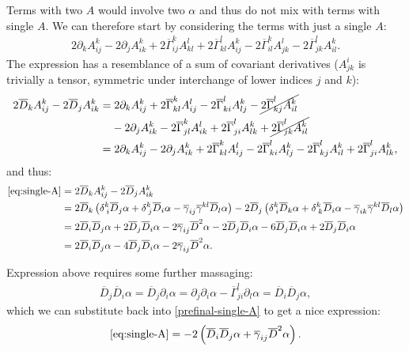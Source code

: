 \documentclass[aps,prd,preprint]{revtex4-1}
\newcommand{\ogamma}{\overline{\gamma}}
\newcommand{\OGamma}{\overline{\Gamma}}
\newcommand{\OD}{\overline{D}}
\begin{document}
Terms with two $A$ would involve two $\alpha$ and thus do not mix with terms with single $A$. We can therefore 
start by considering the terms with just a single $A$:
\begin{align}\label{eq:single-A}
2 \partial_k A^k_{ij} -2 \partial_j A^k_{ik} +
  2 \OGamma^k_{ij} A^l_{kl}  + 2 \OGamma^l_{kl} A^k_{ij} -
  2 \OGamma^k_{il} A^l_{jk} - 2 \OGamma^l_{jk} A^k_{il}.
\end{align}
The expression has a resemblance of a sum of covariant derivatives ($A^i_{jk}$ is trivially a tensor, symmetric under
interchange of lower indices $j$ and $k$):
\begin{align}\label{eq:cov-diff}
2 \OD_k A^k_{ij} - 2 \OD_j A^k_{ik} = & \;
  2 \partial_k A^k_{ij} + 2 \OGamma^k_{kl} A^l_{ij} - 2 \OGamma^l_{ki} A^k_{lj} -
    \cancel{2 \OGamma^l_{kj} A^k_{il}} \notag \\
  & - 2 \partial_j A^k_{ik} - 2 \OGamma^k_{jl} A^l_{ik} + 2 \OGamma^l_{ji} A^k_{lk} + \cancel{2 \OGamma^l_{jk} A^k_{il}} \\
= & \; 2 \partial_k A^k_{ij} - 2 \partial_j A^k_{ik} + 2 \OGamma^k_{kl} A^l_{ij} - 2 \OGamma^l_{ki} A^k_{lj} -
  2 \OGamma^l_{kj} A^k_{il} + 2 \OGamma^l_{ji} A^k_{lk},
\end{align}
and thus:
\begin{align}
\eqref{eq:single-A} = & \; 2 \OD_k A^k_{ij} - 2 \OD_j A^k_{ik} \\
= & \; 2 \OD_k \left(
    \delta^k_{\; i} \OD_j \alpha + \delta^k_{\; j} \OD_i \alpha - \ogamma_{ij} \ogamma^{kl} \OD_l \alpha
  \right) -
  2 \OD_j \left(
    \delta^k_{\; i} \OD_k \alpha + \delta^k_{\; k} \OD_i \alpha - \ogamma_{ik} \ogamma^{kl} \OD_l \alpha
  \right) \\
= & \; 2 \OD_i \OD_j \alpha + 2 \OD_j \OD_i \alpha - 2 \ogamma_{ij} \OD^2 \alpha - 2 \OD_j \OD_i \alpha -
  6 \OD_j \OD_i \alpha + 2 \OD_j \OD_i \alpha \\
= & \; 2 \OD_i \OD_j \alpha - 4 \OD_j \OD_i \alpha - 2 \ogamma_{ij} \OD^2 \alpha \label{prefinal-single-A}.
\end{align}

Expression above requires some further massaging:
\begin{align}
\OD_j \OD_i \alpha = \OD_j \partial_i \alpha = \partial_j \partial_i \alpha - \OGamma^l_{ji} \partial_l \alpha =
\OD_i \OD_j \alpha,
\end{align}
which we can substitute back into \eqref{prefinal-single-A} to get a nice expression:
\begin{align}\label{eq:final-single-A}
\eqref{eq:single-A} = -2 \left( \OD_i \OD_j \alpha + \ogamma_{ij} \OD^2 \alpha \right).
\end{align}
\end{document}
